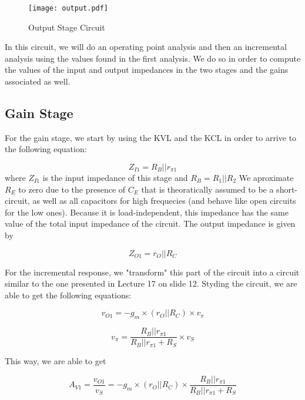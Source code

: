 \begin{figure}[H] \centering
\texttt{[image: output.pdf]}
\caption{Output Stage Circuit}
\label{fig:output}
\end{figure}


In this circuit, we will do an operating point analysis and then an incremental analysis using the values found in the first analysis. We do so in order to compute the values of the input and output impedances in the two stages and the gains associated as well.

\subsection{Gain Stage}

For the gain stage, we start by using the KVL and the KCL in order to arrive to the following equation:

\begin{equation}
Z_{I1} = R_B||r_{\pi1}
\label{eq:1.1}
\end{equation}
where $Z_{I1}$ is the input impedance of this stage and $R_B = R_1 || R_2$
We aproximate $R_E$ to zero due to the presence of $C_E$ that is theoratically assumed to be a short-circuit, as well as all capacitors for high frequecies (and behave like open circuits for the low ones). Because it is load-independent, this impedance has the same value of the total input impedance of the circuit.
The output impedance is given by 

\begin{equation}
Z_{O1} = r_O||R_C
\label{eq:1.2}
\end{equation}

For the incremental response, we "transform" this part of the circuit into a circuit similar to the one presented in Lecture 17 on slide 12. Styding the circuit, we are able to get the following equations:

\begin{equation}
v_{O1} = -g_m \times (r_O||R_C) \times v_\pi
\label{eq:1.3}
\end{equation}

\begin{equation}
v_\pi = \frac{R_B||r_{\pi 1}}{R_B||r_{\pi 1}+R_S} \times v_S
\label{eq:1.4}
\end{equation}

This way, we are able to get

\begin{equation}
A_{V1} = \frac{v_{O1}}{v_S} = -g_m \times (r_O||R_C) \times \frac{R_B||r_{\pi 1}}{R_B||r_{\pi 1}+R_S}
\label{eq:1.5}
\end{equation}

